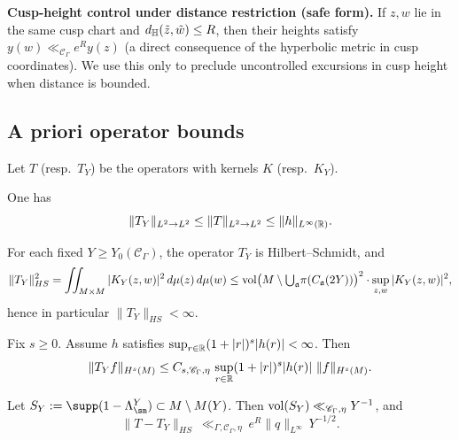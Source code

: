 \noindent
\textbf{Cusp-height control under distance restriction (safe form).}
If $z,w$ lie in the same cusp chart and $d_{\mathbb{H}}(\tilde z,\tilde w)\le R$, then their heights satisfy
$y(w)\ll_{\mathscr C_\Gamma} e^{R}y(z)$ (a direct consequence of the hyperbolic metric in cusp coordinates).
We use this only to preclude uncontrolled excursions in cusp height when distance is bounded.

\subsection{A priori operator bounds}\label{subsec:block3.4}

Let $T$ (resp.\ $T_Y$) be the operators with kernels $K$ (resp.\ $K_Y$).

\begin{lemma}\label{lem:L2-opnorm}
One has
\begin{equation}\label{eq:L2-opnorm}
\|T_Y\|_{L^2\to L^2}\le \|T\|_{L^2\to L^2}\le \|h\|_{L^\infty(\mathbb{R})}.
\end{equation}
\end{lemma}

\begin{lemma}\label{lem:HS-bound}
For each fixed $Y\ge Y_0(\mathscr C_\Gamma)$, the operator $T_Y$ is Hilbert--Schmidt, and
\begin{equation}\label{eq:HS-bound}
\|T_Y\|_{HS}^2
=\iint_{M\times M}|K_Y(z,w)|^2\,d\mu(z)\,d\mu(w)
\le \mathop{\mathrm{vol}}\nolimits\!\big(M\setminus{\textstyle\bigcup_{\mathfrak a}}\pi(C_{\mathfrak a}(2Y))\big)^2
\cdot \sup_{z,w}|K_Y(z,w)|^2,
\end{equation}
hence in particular $\|T_Y\|_{HS}<\infty$.
\end{lemma}

\begin{proposition}\label{prop:sobolev-KY}
Fix $s\ge 0$. Assume $h$ satisfies $\sup_{r\in\mathbb{R}}(1+|r|)^s|h(r)|<\infty$.
Then
\begin{equation}\label{eq:sobolev-KY}
\|T_Y f\|_{H^s(M)}
\le C_{s,\mathscr C_\Gamma,\eta}\,
\sup_{r\in\mathbb{R}}(1+|r|)^s|h(r)|\ \|f\|_{H^s(M)}.
\end{equation}
\end{proposition}

\begin{proposition}\label{prop:tail-HS}
Let $S_Y:=\supp(1-\Lambda^Y_{\sm})\subset M\setminus M(Y)$.
Then $\mathop{\mathrm{vol}}\nolimits(S_Y)\ll_{\mathscr C_\Gamma,\eta} Y^{-1}$, and
\begin{equation}\label{eq:tail-HS}
\|T-T_Y\|_{HS}\ \ll_{\Gamma,\mathscr C_\Gamma,\eta}\ e^{R}\|q\|_{L^\infty}\,Y^{-1/2}.
\end{equation}
\end{proposition}

